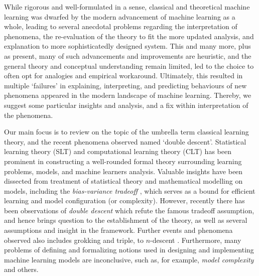 While rigorous and well-formulated in a sense, classical and theoretical machine learning was dwarfed by the modern advancement of machine learning as a whole, leading to several anecdotal problems regarding the interpretation of phenomena, the re-evaluation of the theory to fit the more updated analysis, and explanation to more sophisticatedly designed system. This and many more, plus as present, many of such advancements and improvements are heuristic, and the general theory and conceptual understanding remain limited, led to the choice to often opt for analogies and empirical workaround. Ultimately, this resulted in multiple `failures' in explaining, interpreting, and predicting behaviours of new phenomena appeared in the modern landscape of machine learning. Thereby, we suggest some particular insights and analysis, and a fix within interpretation of the phenomena. 

Our main focus is to review on the topic of the umbrella term classical learning theory, and the recent phenomena observed named `double descent'. Statistical learning theory (SLT) and computational learning theory (CLT) \cite{Vapnik1999-VAPTNO,10.5555/2371238,10.5555/2621980,STL_Hajek_Maxim_2021,bousquet2020theoryuniversallearning} has been prominent in constructing a well-rounded formal theory surrounding learning problems, models, and machine learners analysis. Valuable insights have been dissected from treatment of statistical theory and mathematical modelling on models, including the \textit{bias-variance tradeoff} \cite{6797087,Domingos2000AUB}, which serves as a bound for efficient learning and model configuration (or complexity). However, recently there has been observations of \textit{double descent} \cite{belkin_reconciling_2019,schaeffer_double_2023,nakkiran_deep_2019,lafon_understanding_2024} which refute the famous tradeoff assumption, and hence brings question to the establishment of the theory, as well as several assumptions and insight in the framework. Further events and phenomena observed also includes grokking and triple, to $n$-descent \cite{davies_unifying_2023,d_ascoli_triple_2020}. Furthermore, many problems of defining and formalizing notions used in designing and implementing machine learning models are inconclusive, such as, for example, \textit{model complexity} and others. 

